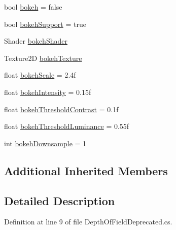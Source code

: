 \begin{DoxyCompactItemize}
\item 
bool \mbox{\hyperlink{class_unity_standard_assets_1_1_image_effects_1_1_depth_of_field_deprecated_ac5740a8e9bf562cd32b8577532707efe}{bokeh}} = false
\item 
bool \mbox{\hyperlink{class_unity_standard_assets_1_1_image_effects_1_1_depth_of_field_deprecated_a5ace36c0ca1babd748f88cf0eaebfc4a}{bokeh\+Support}} = true
\item 
Shader \mbox{\hyperlink{class_unity_standard_assets_1_1_image_effects_1_1_depth_of_field_deprecated_a973e49240b47ee7e0773cf2b0737d012}{bokeh\+Shader}}
\item 
Texture2D \mbox{\hyperlink{class_unity_standard_assets_1_1_image_effects_1_1_depth_of_field_deprecated_a6c316aeb12af77c4586428b2d40524a8}{bokeh\+Texture}}
\item 
float \mbox{\hyperlink{class_unity_standard_assets_1_1_image_effects_1_1_depth_of_field_deprecated_a4126e6aa3ab234096a444278a717bf93}{bokeh\+Scale}} = 2.\+4f
\item 
float \mbox{\hyperlink{class_unity_standard_assets_1_1_image_effects_1_1_depth_of_field_deprecated_a2d6cad3430448a6d26b8fa1c48007db5}{bokeh\+Intensity}} = 0.\+15f
\item 
float \mbox{\hyperlink{class_unity_standard_assets_1_1_image_effects_1_1_depth_of_field_deprecated_a068787ec057a885c83c77c85e2d89e92}{bokeh\+Threshold\+Contrast}} = 0.\+1f
\item 
float \mbox{\hyperlink{class_unity_standard_assets_1_1_image_effects_1_1_depth_of_field_deprecated_a6c9aaaa9c8965e6bab4524e1a41d6083}{bokeh\+Threshold\+Luminance}} = 0.\+55f
\item 
int \mbox{\hyperlink{class_unity_standard_assets_1_1_image_effects_1_1_depth_of_field_deprecated_aec24f4157afedaad519f95a466e449f2}{bokeh\+Downsample}} = 1
\end{DoxyCompactItemize}
\subsection*{Additional Inherited Members}


\subsection{Detailed Description}


Definition at line 9 of file Depth\+Of\+Field\+Deprecated.\+cs.



